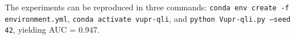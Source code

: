 The experiments can be reproduced in three commands:
\texttt{conda env create -f environment.yml},
\texttt{conda activate vupr-qli}, and
\texttt{python Vupr-qli.py --seed 42}, yielding AUC = 0.947.
